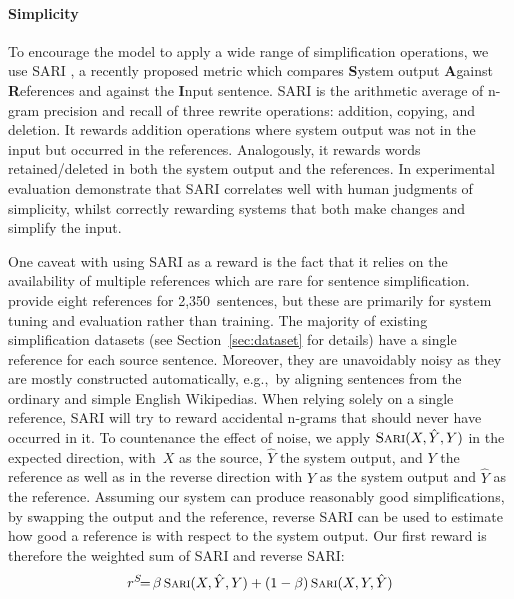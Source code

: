 \documentclass[11pt,letterpaper]{article}
\begin{document}
\paragraph{Simplicity} To encourage the model to apply a wide range of
simplification operations, we use SARI \cite{Xu_TACL16}, a recently
proposed metric which compares \textbf{S}ystem output \textbf{A}gainst
\textbf{R}eferences and against the \textbf{I}nput sentence. SARI is
the arithmetic average of n-gram precision and recall of three rewrite
operations: addition, copying, and deletion. It rewards addition
operations where system output was not in the input but occurred in
the references. Analogously, it rewards words retained/deleted in both
the system output and the references. In experimental evaluation
 demonstrate that SARI correlates well with human
judgments of simplicity, whilst correctly rewarding systems that both
make changes and simplify the input.

One caveat with using SARI as a reward is the fact that it relies on
the availability of multiple references which are rare for sentence
simplification.  provide eight references for
2,350~sentences, but these are primarily for system tuning and
evaluation rather than training.  The majority of existing
simplification datasets (see Section~\ref{sec:dataset} for details)
have a single reference for each source sentence. Moreover, they are
unavoidably noisy as they are mostly constructed automatically,
e.g.,~by aligning sentences from the ordinary and simple English
Wikipedias. When relying solely on a single reference, SARI will try
to reward accidental n-grams that should never have occurred in it. To
countenance the effect of noise, we apply
$\textsc{Sari}(X, \hat{Y}, Y)$ in the expected direction, with~$X$ as
the source, $\hat{Y}$ the system output, and $Y$ the reference as well
as in the reverse direction with $Y$ as the system output and
$\hat{Y}$ as the reference.  Assuming our system can produce
reasonably good simplifications, by swapping the output and the
reference, reverse SARI can be used to estimate how good a reference
is with respect to the system output.  Our first reward is therefore
the weighted sum of SARI and reverse SARI:
\begin{equation}
\label{eq:auto}
r^S \hspace*{-1ex}=\hspace*{-.3ex}  \beta \,  \textsc{\small Sari}(X, \hat{Y}, Y) 
+ (1 - \beta) \, \textsc{\small Sari}(X, Y, \hat{Y})
\end{equation}
\end{document}
